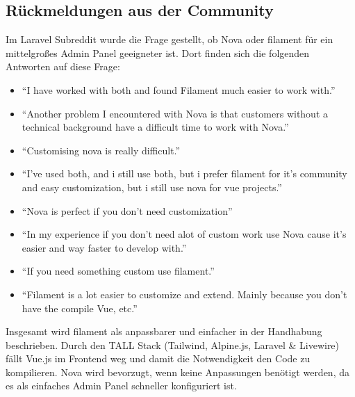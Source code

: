 \subsection{Rückmeldungen aus der Community}
Im Laravel Subreddit wurde die Frage gestellt, ob Nova oder filament für ein mittelgroßes Admin Panel geeigneter ist\cite{reddit-laravel-nova-vs-filament}.
Dort finden sich die folgenden Antworten auf diese Frage:

\begin{itemize}
    \item \enquote{I have worked with both and found Filament much easier to work with.}
    \item \enquote{Another problem I encountered with Nova is that customers without a technical background have a difficult time to work with Nova.}
    \item \enquote{Customising nova is really difficult.}
    \item \enquote{I've used both, and i still use both, but i prefer filament for it's community and easy customization, but i still use nova for vue projects.}
    \item \enquote{Nova is perfect if you don't need customization}
    \item \enquote{In my experience if you don’t need alot of custom work use Nova cause it’s easier and way faster to develop with.}
    \item \enquote{If you need something custom use filament.}
    \item \enquote{Filament is a lot easier to customize and extend. Mainly because you don’t have the compile Vue, etc.}
\end{itemize}

Insgesamt wird filament als anpassbarer und einfacher in der Handhabung beschrieben.
Durch den TALL Stack (Tailwind, Alpine.js, Laravel \& Livewire) fällt Vue.js im Frontend weg und damit die Notwendigkeit den Code zu kompilieren.
Nova wird bevorzugt, wenn keine Anpassungen benötigt werden, da es als einfaches Admin Panel schneller konfiguriert ist.
